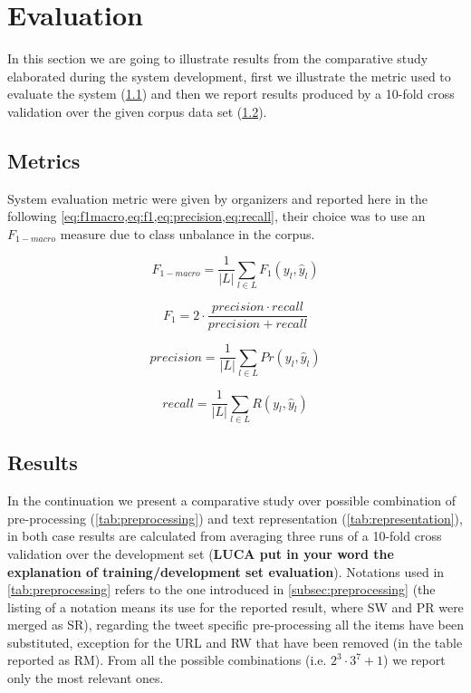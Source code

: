 \section{Evaluation} \label{sec:evaluation}

In this section we are going to illustrate results from the comparative study elaborated during the system development, first we illustrate the metric used to evaluate the system (\cref{subsec:metric}) and then we report results produced by a 10-fold cross validation over the given corpus data set (\cref{subsec:results}).

\subsection{Metrics} \label{subsec:metric}

System evaluation metric were given by organizers and reported here in the following \cref{eq:f1macro,eq:f1,eq:precision,eq:recall}, their choice was to use an $F_{1-macro}$ measure due to class unbalance in the corpus.

\begin{multicols}{2}
\begin{equation} \label{eq:f1macro}
F_{1-macro} = \frac{1}{|L|} \displaystyle\sum_{l\in L} F_1(y_l, \hat{y}_l)
\end{equation}

\begin{equation} \label{eq:f1}
F_1 = 2 \cdot \frac{precision \cdot recall }{precision + recall}
\end{equation}

\begin{equation} \label{eq:precision}
precision = \frac{1}{|L|} \displaystyle\sum_{l\in L} Pr(y_l, \hat{y}_l)
\end{equation}

\begin{equation} \label{eq:recall}
recall = \frac{1}{|L|} \displaystyle\sum_{l\in L} R(y_l, \hat{y}_l)
\end{equation}
\end{multicols}



\subsection{Results} \label{subsec:results}

In the continuation we present a comparative study over possible combination of pre-processing (\cref{tab:preprocessing}) and text representation (\cref{tab:representation}), in both case results are calculated from averaging three runs of a 10-fold cross validation over the development set (\textbf{LUCA put in your word the explanation of training/development set evaluation}).
Notations used in \cref{tab:preprocessing} refers to the one introduced in \cref{subsec:preprocessing} (the listing of a notation means its use for the reported result, where SW and PR were merged as SR), regarding the tweet specific pre-processing all the items have been substituted, exception for the URL and RW that have been removed (in the table reported as RM). From all the possible combinations (i.e. $2^3\cdot3^{7}+1$) we report only the most relevant ones.

